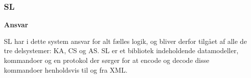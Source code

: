 \subsubsection{\gls{SL}}

\textbf{Ansvar}

\gls{SL} har i dette system ansvar for alt fælles logik, og bliver derfor tilgået af alle de tre delsystemer: \gls{KA}, \gls{CS} og \gls{AS}. \gls{SL} er et bibliotek indeholdende datamodeller, kommandoer og en protokol der sørger for at encode og decode disse kommandoer henholdsvis til og fra XML.